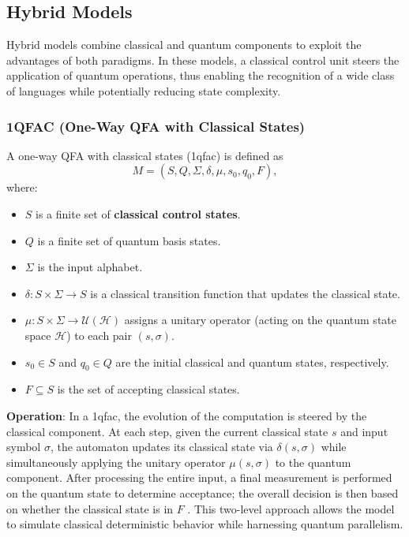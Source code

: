 \subsection{Hybrid Models}
\label{subsec:hybrid-models}

Hybrid models combine classical and quantum components to exploit the advantages of both paradigms. In these models, a classical control unit steers the application of quantum operations, thus enabling the recognition of a wide class of languages while potentially reducing state complexity.

\subsubsection{1QFAC (One-Way QFA with Classical States)}
\label{sssec:1qfac}
\begin{definition}[1QFAC]
A one-way QFA with classical states (\gls{1qfac}) is defined as 
\[
M = (S, Q, \Sigma, \delta, \mu, s_0, q_0, F),
\]
where:
\begin{itemize}
    \item \( S \) is a finite set of \textbf{classical control states}.
    \item \( Q \) is a finite set of quantum basis states.
    \item \( \Sigma \) is the input alphabet.
    \item \(\delta: S \times \Sigma \to S\) is a classical transition function that updates the classical state.
    \item \(\mu: S \times \Sigma \to \mathcal{U}(\mathcal{H})\) assigns a unitary operator (acting on the quantum state space \(\mathcal{H}\)) to each pair \((s,\sigma)\).
    \item \( s_0 \in S \) and \( q_0 \in Q \) are the initial classical and quantum states, respectively.
    \item \( F \subseteq S \) is the set of accepting classical states.
\end{itemize}
\end{definition}

\textbf{Operation}:  
In a \gls{1qfac}, the evolution of the computation is steered by the classical component. At each step, given the current classical state \( s \) and input symbol \( \sigma \), the automaton updates its classical state via \(\delta(s,\sigma)\) while simultaneously applying the unitary operator \(\mu(s,\sigma)\) to the quantum component. After processing the entire input, a final measurement is performed on the quantum state to determine acceptance; the overall decision is then based on whether the classical state is in \( F \) \cite{zheng2012one}. This two-level approach allows the model to simulate classical deterministic behavior while harnessing quantum parallelism.

